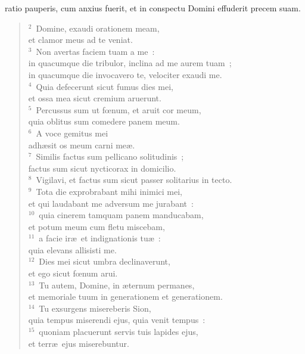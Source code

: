 \bchapter
{}ratio pauperis, cum anxius fuerit, et in conspectu Domini effuderit precem suam.
\begin{flushleft}\begin{verse}\vspace{6pt}${}^{2}$~Domine, exaudi orationem meam,\\ et clamor meus ad te veniat.\\
${}^{3}$~Non avertas faciem tuam a me~:\\ in quacumque die tribulor, inclina ad me aurem tuam~;\\ in quacumque die invocavero te, velociter exaudi me.\\
${}^{4}$~Quia defecerunt sicut fumus dies mei,\\ et ossa mea sicut cremium aruerunt.\\
${}^{5}$~Percussus sum ut fœnum, et aruit cor meum,\\ quia oblitus sum comedere panem meum.\\
${}^{6}$~A voce gemitus mei\\ adh\ae sit os meum carni me\ae .\\
${}^{7}$~Similis factus sum pellicano solitudinis~;\\ factus sum sicut nycticorax in domicilio.\\
${}^{8}$~Vigilavi, et factus sum sicut passer solitarius in tecto.\\
${}^{9}$~Tota die exprobrabant mihi inimici mei,\\ et qui laudabant me adversum me jurabant~:\\
${}^{10}$~quia cinerem tamquam panem manducabam,\\ et potum meum cum fletu miscebam,\\
${}^{11}$~a facie ir\ae\ et indignationis tu\ae~:\\ quia elevans allisisti me.\\
${}^{12}$~Dies mei sicut umbra declinaverunt,\\ et ego sicut fœnum arui.\\
${}^{13}$~Tu autem, Domine, in \ae ternum permanes,\\ et memoriale tuum in generationem et generationem.\\
${}^{14}$~Tu exsurgens misereberis Sion,\\ quia tempus miserendi ejus, quia venit tempus~:\\
${}^{15}$~quoniam placuerunt servis tuis lapides ejus,\\ et terr\ae\ ejus miserebuntur.\\

\end{verse}
\end{flushleft}
